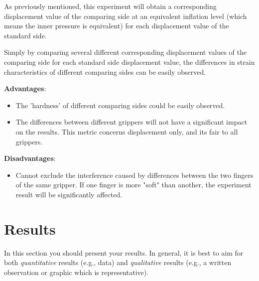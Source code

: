 \documentclass[conference]{IEEEtran}
\begin{document}
As previously mentioned, this experiment will obtain a corresponding displacement value of the comparing side at an equivalent inflation level (which means the inner pressure is equivalent) for each displacement value of the standard side.

 Simply by comparing  several different corresponding displacement values of the comparing side for each standard side displacement value, the differences in strain characteristics of different comparing sides can be easily observed.

 \textbf{Advantages}:
 \begin{itemize}
     \item The 'hardness' of different comparing sides could be easily observed.
     \item The differences between different grippers will not have a significant impact on the results. This metric concerns displacement only, and its fair to all grippers.
 \end{itemize}
 
 \textbf{Disadvantages}:
  \begin{itemize}
     \item Cannot exclude the interference caused by differences between the two fingers of the same gripper. If one finger is more "soft" than another, the experiment result will be significantly affected.
 \end{itemize}

\section{Results}

In this section you should present your results.  In general, it is best to aim for both \emph{quantitative} results (e.g., data) and \emph{qualitative} results (e.g., a written observation or graphic which is representative).  
\end{document}
